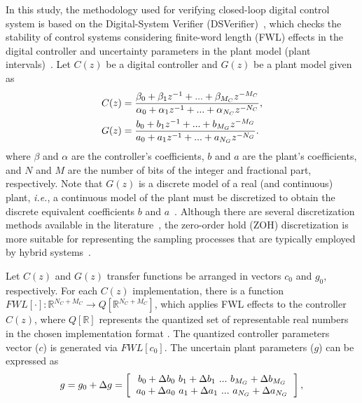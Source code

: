 \documentclass{sig-alternate-05-2015}
\begin{document}
In this study, the methodology used for verifying closed-loop digital
control system is based on the Digital-System Verifier
(DSVerifier)~\cite{IsmailBCFF15}, which checks the stability of control
systems considering finite-word length (FWL) effects in the digital
controller and uncertainty parameters in the plant model (plant
intervals)~\cite{Bessa16}.  Let $C(z)$ be a digital controller and $G(z)$ be
a plant model given as
%
\begin{align}
\small
\label{controller_plant_tf}
C(z)&=\frac{\beta_{0}+\beta_{1}z^{-1}+...+\beta_{M_C}z^{-M_C}}{\alpha_{0}+\alpha_{1}z^{-1}+...+\alpha_{N_C}z^{-N_C}}, \\
G(z)&=\frac{b_{0}+b_{1}z^{-1}+...+b_{M_G}z^{-M_G}}{a_{0}+a_{1}z^{-1}+...+a_{N_G}z^{-N_G}}.
\end{align}
%
\noindent where $\beta$ and $\alpha$ are the controller's coefficients, $b$
and $a$ are the plant's coefficients, and $N$ and $M$ are the number of bits
of the integer and fractional part, respectively.  Note that $G(z)$ is a
discrete model of a real (and continuous) plant, {\it i.e.}, a continuous
model of the plant must be discretized to obtain the discrete equivalent
coefficients $b$ and $a$~\cite{Astrom08}.  Although there are several
discretization methods available in the literature~\cite{Franklin15}, the
zero-order hold (ZOH) discretization is more suitable for representing the
sampling processes that are typically employed by hybrid
systems~\cite{istepanian2012digital}.

Let $C(z)$ and $G(z)$ transfer functions be arranged in vectors $c_0$ and
$g_0$, respectively.  For each $C(z)$ implementation, there is a function
$\mathit{FWL}[\cdot]:\mathbb{R}^{N_C+M_C}\rightarrow
Q[\mathbb{R}^{N_C+M_C}]$, which applies FWL effects to the controller
$C(z)$, where $Q[\mathbb{R}]$ represents the quantized set of representable
real numbers in the chosen implementation format .  The
quantized controller parameters vector ($c$) is generated via
$\mathit{FWL}[c_0]$.  The uncertain plant parameters ($g$) can be expressed
as
%
\begin{equation}
g = g_0 + \Delta{g} = \left [
				\begin{tabular}{c}
				$b_{0}+\Delta{b_{0}} ~ b_{1}+\Delta{b_{1}} ~ ... ~ b_{M_G}+\Delta{b_{M_G}}$ \\%
				$a_{0}+\Delta{a_{0}} ~ a_{1}+\Delta{a_{1}} ~ ... ~ a_{N_G}+\Delta{a_{N_G}}$
				\end{tabular}
				\right ],
\end{equation}
 
\end{document}
